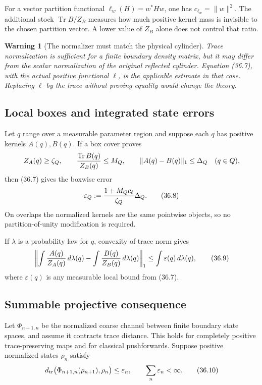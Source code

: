 \documentclass[11pt]{article}
\newtheorem{warning}[theorem]{Warning}
\theoremstyle{remark}
\begin{document}
For a vector partition functional
\(\ell_w(H)=w^*Hw\), one has
\(c_{\ell_w}=\|w\|^2\).  The additional stock
\(\operatorname{Tr}B/Z_B\) measures how much positive kernel mass is
invisible to the chosen partition vector.  A lower value of \(Z_B\)
alone does not control that ratio.

\begin{warning}[The normalizer must match the physical cylinder]
\label{warn:v12v36-physical-normalizer}
Trace normalization is sufficient for a finite boundary density
matrix, but it may differ from the scalar normalization of the
original reflected cylinder.  Equation (36.7), with the actual
positive functional \(\ell\), is the applicable estimate in that
case.  Replacing \(\ell\) by the trace without proving equality would
change the theory.
\end{warning}

\subsection{Local boxes and integrated state errors}

Let \(q\) range over a measurable parameter region and suppose each
\(q\) has positive kernels \(A(q),B(q)\).  If a box cover proves
\[
 Z_A(q)\geq\zeta_Q,\qquad
 {\operatorname{Tr}B(q)\over Z_B(q)}\leq M_Q,\qquad
 \|A(q)-B(q)\|_1\leq\Delta_Q
 \quad(q\in Q),
\]
then (36.7) gives the boxwise error
\begin{equation}
 \varepsilon_Q
 :=
 {1+M_Qc_\ell\over\zeta_Q}\Delta_Q.              \tag{36.8}
\end{equation}
On overlaps the normalized kernels are the same pointwise objects,
so no partition-of-unity modification is required.

If \(\lambda\) is a probability law for \(q\), convexity of trace
norm gives
\begin{equation}
 \left\|
 \int {A(q)\over Z_A(q)}\,d\lambda(q)
 -
 \int {B(q)\over Z_B(q)}\,d\lambda(q)
 \right\|_1
 \leq
 \int\varepsilon(q)\,d\lambda(q),                \tag{36.9}
\end{equation}
where \(\varepsilon(q)\) is any measurable local bound from (36.7).

\subsection{Summable projective consequence}

Let \(\Phi_{n+1,n}\) be the normalized coarse channel between finite
boundary state spaces, and assume it contracts trace distance.  This
holds for completely positive trace-preserving maps and for
classical pushforwards.  Suppose positive normalized states
\(\rho_n\) satisfy
\begin{equation}
 d_{\rm tr}\bigl(
 \Phi_{n+1,n}(\rho_{n+1}),\rho_n
 \bigr)\leq\varepsilon_n,
 \qquad
 \sum_n\varepsilon_n<\infty.                    \tag{36.10}
\end{equation}
\end{document}
